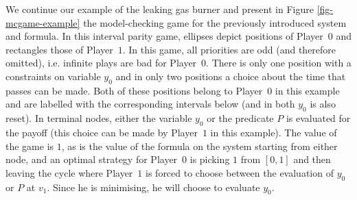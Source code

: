 \documentclass[fleqn,envcountsame]{LMCS}
\newcommand{\ie}{i.e.\xspace}
\newcommand{\pzero}{Player~$0$\xspace}
\newcommand{\pone}{Player~$1$\xspace}
\begin{document}
\begin{exa}
We continue our example of the leaking gas burner and present in
Figure \ref{fig-mcgame-example} the model-checking
game for the previously introduced system and formula.
In this interval parity game, ellipses depict positions of \pzero and rectangles
those of \pone. In this game, all priorities are odd (and therefore
omitted), \ie infinite plays are bad for \pzero.
There is only one position with a constraints on variable $y_0$ and
in only two positions a choice about the time that passes can be made.
Both of these positions belong to \pzero in this example and are labelled
with the corresponding intervals below (and in both $y_0$ is also reset).
In terminal nodes, either the variable $y_0$ or the predicate
$P$ is evaluated for the payoff (this choice can be made by \pone in this example).
The value of the game is $1$, as is the value of the formula on the
system starting from either node, and an optimal strategy for
\pzero is picking $1$ from $[0,1]$ and then leaving the cycle
where \pone is forced to choose between the evaluation of
$y_0$ or $P$ at $v_1$. Since he is minimising, he will choose
to evaluate $y_0$.


\end{exa}
\end{document}
